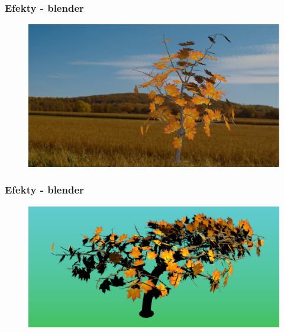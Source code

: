 \documentclass[blue,table]{beamer}
\begin{document}
\begin{frame}\frametitle{Efekty - blender}
\begin{figure}
\includegraphics[scale=0.3]{img/blender/blender12.png} 
\end{figure}
\end{frame}

\begin{frame}\frametitle{Efekty - blender}
\begin{figure}
\includegraphics[scale=0.4]{img/blender/blender13.png} 
\end{figure}
\end{frame}
\end{document}
